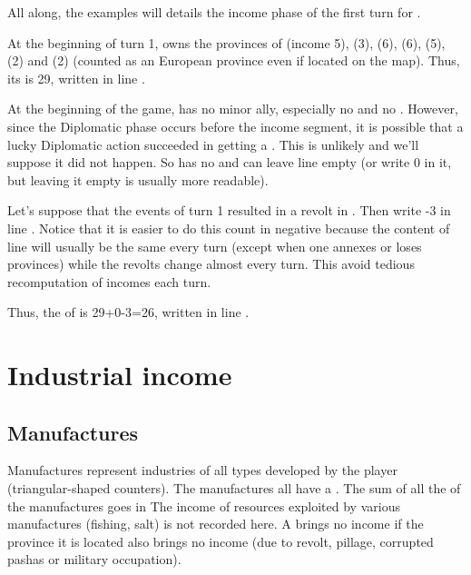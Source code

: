 \begin{exemple}
  All along, the examples will details the income phase of the first
  turn for \POR.

  At the beginning of turn 1, \POR owns the provinces of
   (income 5), \provinceBeira (3),
  \provinceTejo (6), \provinceAlentejo (6), \provinceAlgarve (5),
  \provinceTanger (2) and \provinceAcores (2) (counted as an European
  province even if located on the \ROTW map). Thus, its  is 29\ducats, written in line .

  At the beginning of the game, \POR has no minor ally, especially no
  \VASSAL and no . However, since the
  Diplomatic phase occurs before the income segment, it is possible that
  a lucky Diplomatic action succeeded in getting \POR a \VASSAL. This is
  unlikely and we'll suppose it did not happen. So \POR has no
   and can leave line  empty (or write 0 in it, but leaving it empty is
  usually more readable).

  Let's suppose that the events of turn 1 resulted in a revolt in
  \provinceBeira. Then \POR write -3 in line . Notice that it is easier to do this count in
  negative because the content of line 
  will usually be the same every turn (except when one annexes or loses
  provinces) while the revolts change almost every turn. This avoid
  tedious recomputation of incomes each turn.

  Thus, the  of \POR is 29+0-3=26\ducats, written in
  line .
\end{exemple}


\section{Industrial income}\label{chIncomes:IndustrialIncome}
\subsection{Manufactures}\label{chIncomes:Manufactures}
\aparag Manufactures represent industries of all types developed by the
player (triangular-shaped counters).
\aparag The manufactures all have a .
\bparag The sum of all the  of the manufactures
goes in 
\bparag The income of resources exploited by various manufactures
(fishing, salt) is not recorded here.
\bparag A \MNU brings no income if the province it is located also
brings no income (due to revolt, pillage, corrupted pashas or military
occupation).

